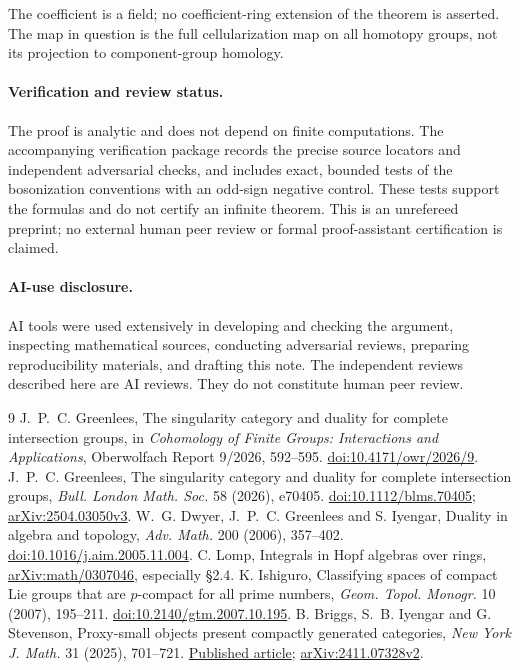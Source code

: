 \documentclass[11pt]{article}
\begin{document}
The coefficient is a field; no coefficient-ring extension of the theorem is asserted. The map in question is the full cellularization map on all homotopy groups, not its projection to component-group homology.

\paragraph{Verification and review status.}
The proof is analytic and does not depend on finite computations. The accompanying verification package records the precise source locators and independent adversarial checks, and includes exact, bounded tests of the bosonization conventions with an odd-sign negative control. These tests support the formulas and do not certify an infinite theorem. This is an unrefereed preprint; no external human peer review or formal proof-assistant certification is claimed.

\paragraph{AI-use disclosure.}
AI tools were used extensively in developing and checking the argument, inspecting mathematical sources, conducting adversarial reviews, preparing reproducibility materials, and drafting this note. The independent reviews described here are AI reviews. They do not constitute human peer review.

\begin{thebibliography}{9}
 J.~P.~C. Greenlees, The singularity category and duality for complete intersection groups, in \emph{Cohomology of Finite Groups: Interactions and Applications}, Oberwolfach Report 9/2026, 592--595. \href{https://doi.org/10.4171/owr/2026/9}{doi:10.4171/owr/2026/9}.
 J.~P.~C. Greenlees, The singularity category and duality for complete intersection groups, \emph{Bull. London Math. Soc.} 58 (2026), e70405. \href{https://doi.org/10.1112/blms.70405}{doi:10.1112/blms.70405}; \href{https://arxiv.org/abs/2504.03050v3}{arXiv:2504.03050v3}.
 W.~G. Dwyer, J.~P.~C. Greenlees and S. Iyengar, Duality in algebra and topology, \emph{Adv. Math.} 200 (2006), 357--402. \href{https://doi.org/10.1016/j.aim.2005.11.004}{doi:10.1016/j.aim.2005.11.004}.
 C. Lomp, Integrals in Hopf algebras over rings, \href{https://arxiv.org/abs/math/0307046}{arXiv:math/0307046}, especially \S2.4.
 K. Ishiguro, Classifying spaces of compact Lie groups that are \(p\)-compact for all prime numbers, \emph{Geom. Topol. Monogr.} 10 (2007), 195--211. \href{https://doi.org/10.2140/gtm.2007.10.195}{doi:10.2140/gtm.2007.10.195}.
 B. Briggs, S.~B. Iyengar and G. Stevenson, Proxy-small objects present compactly generated categories, \emph{New York J. Math.} 31 (2025), 701--721. \href{https://nyjm.albany.edu/j/2025/31-26.html}{Published article}; \href{https://arxiv.org/abs/2411.07328v2}{arXiv:2411.07328v2}.
\end{thebibliography}
\end{document}
